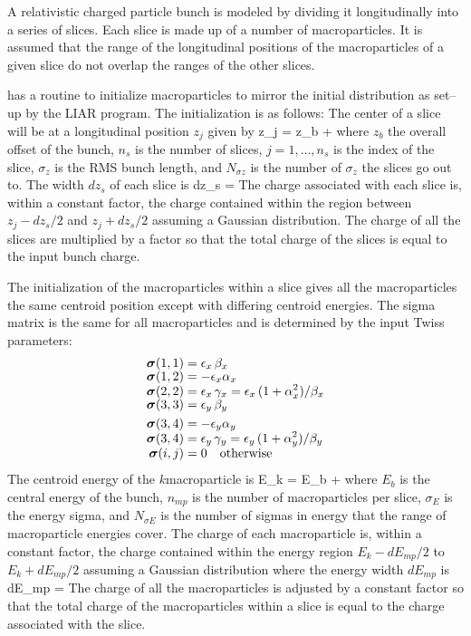 A relativistic charged particle bunch is modeled by dividing it longitudinally
into a series
of slices. Each slice is made up of a number of macroparticles. It is assumed
that the range of the longitudinal positions of the macroparticles of a given
slice do not overlap the ranges of the other slices. 

\bmad has a routine to initialize macroparticles to mirror the initial
distribution as set--up by the LIAR program\cite{b:liar}. The
initialization is as follows: The center of a
slice will be at a longitudinal position $z_j$ given by
\Begineq
  z_j = z_b + 
\Endeq
where $z_b$ the overall offset of the bunch, 
$n_s$ is the number of slices, $j = 1, \ldots,
n_s$ is the index of the slice, $\sigma_z$ is the RMS bunch length,
and $N_{\sigma z}$ is the number of $\sigma_z$ the slices go out
to. The width $dz_s$ of each slice is
\Begineq
    dz_s = 
\Endeq
The charge associated with each slice is, within a constant factor,
the charge contained within the region between $z_j - dz_s/2$ and $z_j
+ dz_s/2$ assuming a Gaussian distribution.  The charge of all the
slices are multiplied by a factor so that the total charge of the
slices is equal to the input bunch charge.

The initialization of the macroparticles within a slice gives all the
macroparticles the same centroid position except with differing
centroid energies. 
The sigma matrix is the same for all macroparticles and is
determined by the input Twiss parameters:
\begin{align}
  \bfsigma(1,1) &= \epsilon_x \, \beta_x \CRNEG
  \bfsigma(1,2) &= -\epsilon_x \alpha_x  \CRNEG
  \bfsigma(2,2) &= \epsilon_x \, \gamma_x = 
      \epsilon_x \, (1 + \alpha_x^2) / \beta_x \CRNEG
  \bfsigma(3,3) &= \epsilon_y \, \beta_y \\
  \bfsigma(3,4) &= -\epsilon_y \alpha_y \CRNEG
  \bfsigma(3,4) &= \epsilon_y \, \gamma_y = 
      \epsilon_y \, (1 + \alpha_y^2) / \beta_y \CRNEG
  \bfsigma(i,j) &= 0 \quad \mbox{otherwise} \nonumber
\end{align}
The centroid energy of the $k$\Th macroparticle is
\Begineq
  E_k = E_b + 
\Endeq
where $E_b$ is the central energy of the bunch, $n_{mp}$ is the number
of macroparticles per slice, $\sigma_E$ is the energy sigma, and
$N_{\sigma E}$ is the number of sigmas in energy that the range of
macroparticle energies cover. The charge of each macroparticle is,
within a constant factor, the charge contained within the energy
region $E_k - dE_{mp}/2$ to $E_k + dE_{mp}/2$ assuming a Gaussian
distribution where the energy width $dE_{mp}$ is
\Begineq
  dE_{mp} = 
\Endeq
The charge of all the macroparticles is adjusted by a constant factor
so that the total charge of the macroparticles within a slice is equal
to the charge associated with the slice.



